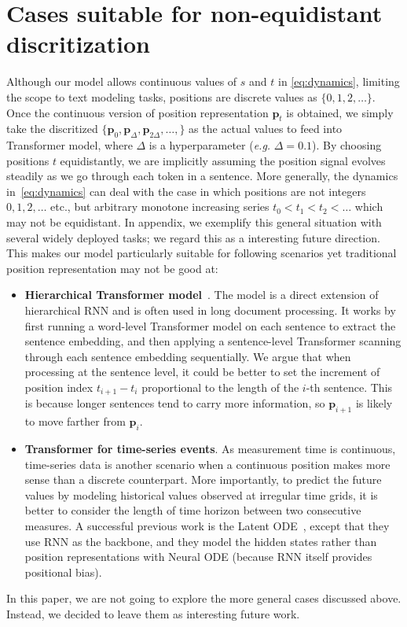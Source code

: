 \documentclass[11pt]{article}
\def\vp{{\bm{p}}}
\begin{document}
\section{Cases suitable for non-equidistant discritization}
Although our model allows continuous values of $s$ and $t$ in \eqref{eq:dynamics}, limiting the scope to text modeling tasks, positions are discrete values as $\{0,1,2,\dots\}$. Once the continuous version of position representation $\vp_t$ is obtained, we simply take the discritized $\{\vp_0,\vp_{\Delta}, \vp_{2\Delta},\dots,\}$ as the actual values to feed into Transformer model, where $\Delta$ is a hyperparameter (\emph{e.g.} $\Delta=0.1$). By choosing positions $t$ equidistantly, we are implicitly assuming the position signal evolves steadily as we go through each token in a sentence. More generally, the dynamics in~\eqref{eq:dynamics} can deal with the case in which positions are not integers $0,1,2,\dots$ etc., but arbitrary monotone increasing series $t_0<t_1<t_2<\dots$ which may not be equidistant. In appendix, we exemplify this general situation with several widely deployed tasks; we regard this as a interesting future direction.
This makes our model particularly suitable for following scenarios yet traditional position representation may not be good at:
\begin{itemize}[nosep,leftmargin=1em,labelwidth=*,align=left]
    \item \textbf{Hierarchical Transformer model}~\cite{liu2019hierarchical,zhang2019HIBERT}. The model is a direct extension of hierarchical RNN and is often used in long document processing. It works by first running a word-level Transformer model on each sentence to extract the sentence embedding, and then applying a sentence-level Transformer scanning through each sentence embedding sequentially. We argue that when processing at the sentence level, it could be better to set the increment of position index $t_{i+1}-t_i$ proportional to the length of the $i$-th sentence. This is because longer sentences tend to carry more information, so $\vp_{i+1}$ is likely to move farther from $\vp_i$.
    \item \textbf{Transformer for time-series events}. As measurement time is continuous, time-series data is another scenario when a continuous position makes more sense than a discrete counterpart. More importantly, to predict the future values by modeling historical values observed at irregular time grids, it is better to consider the length of time horizon between two consecutive measures. A successful previous work is the Latent ODE~\cite{NIPS2018_7892}, except that they use RNN as the backbone, and they model the hidden states rather than position representations with Neural ODE (because RNN itself provides positional bias).
\end{itemize}
In this paper, we are not going to explore the more general cases discussed above. Instead, we decided to leave them as interesting future work.
\end{document}
